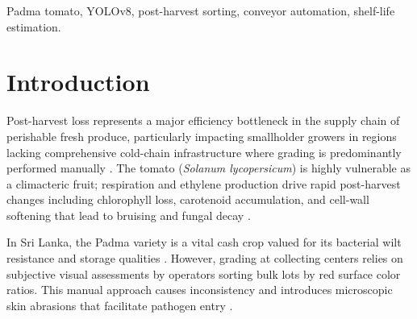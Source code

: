 \documentclass[conference,pageno]{IEEEtran}
\begin{document}
\begin{abstract}
Post-harvest losses remain high for perishable fresh produce like tomatoes in Sri Lanka due to manual grading, which is slow, operator-dependent, and prone to causing physical damage \cite{abekoon2024}. This paper presents an integrated, real-time detection and mechatronic sorting system for the local Padma tomato variety (\textit{Solanum lycopersicum}) \cite{abekoon2024}. The system classifies fruit into four ripening stages (green, breaker, turning, red) and a defect group using a YOLOv8-medium vision pipeline trained on 7,849 validated images \cite{dwyer2024}. Tested on a held-out split, the model achieved a precision of 0.906, a recall of 0.922, and a mAP@50 of 0.936, operating at 6.7 ms per frame \cite{padilla2020, terven2023}. A conveyor prototype driven by a stepper motor and controlled via an ESP32 microcontroller uses non-contact infrared presence sensors to trigger servo-actuated sorting gates dynamically, avoiding timing errors associated with fluctuating belt speeds \cite{moya2025}. Furthermore, each classification is linked to a cultivar-specific remaining shelf-life estimation (ranging from 31 days for green down to 0 days for defects) derived from a 50-green-tomato observational study and reported alongside batch-level key performance indicators on a live interactive dashboard \cite{geetha2025, tarlak2023}.
\end{abstract}

\begin{IEEEkeywords}
Padma tomato, YOLOv8, post-harvest sorting, conveyor automation, shelf-life estimation.
\end{IEEEkeywords}

\section{Introduction}
Post-harvest loss represents a major efficiency bottleneck in the supply chain of perishable fresh produce, particularly impacting smallholder growers in regions lacking comprehensive cold-chain infrastructure where grading is predominantly performed manually \cite{abekoon2024}. The tomato (\textit{Solanum lycopersicum}) is highly vulnerable as a climacteric fruit; respiration and ethylene production drive rapid post-harvest changes including chlorophyll loss, carotenoid accumulation, and cell-wall softening that lead to bruising and fungal decay \cite{abekoon2024}. 

In Sri Lanka, the Padma variety is a vital cash crop valued for its bacterial wilt resistance and storage qualities \cite{abekoon2024}. However, grading at collecting centers relies on subjective visual assessments by operators sorting bulk lots by red surface color ratios. This manual approach causes inconsistency and introduces microscopic skin abrasions that facilitate pathogen entry \cite{abekoon2024}. 
\end{document}
